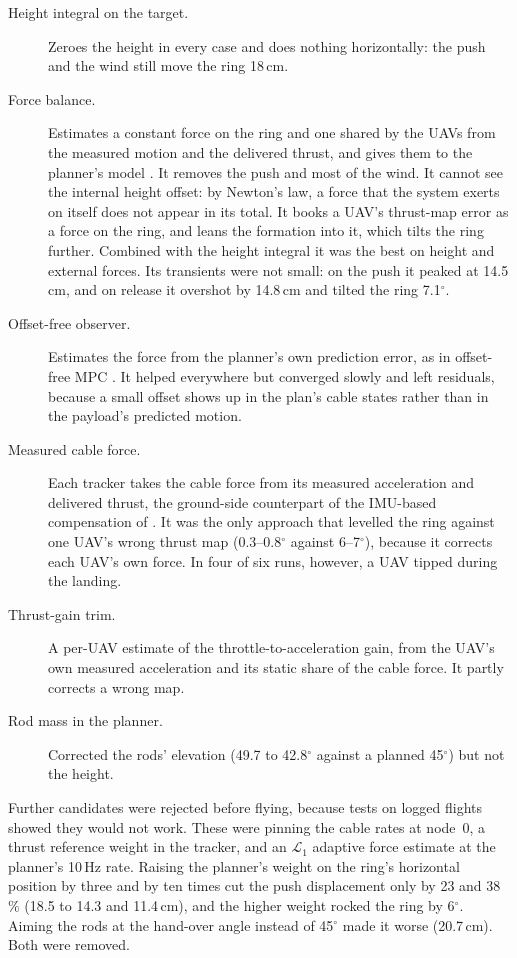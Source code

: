 \begin{description}
    \item[Height integral on the target.] Zeroes the height in every case and does nothing
    horizontally: the push and the wind still move the ring 18\,cm.
    \item[Force balance.] Estimates a constant force on the ring and one shared by the UAVs from
    the measured motion and the delivered thrust, and gives them to the planner's model
    \cite{muske2002disturbance}. It removes the push and most of the wind. It cannot see the internal
    height offset: by Newton's law, a force that the system exerts on itself does not appear in its
    total. It books a UAV's thrust-map error as a force on the ring, and leans the formation into
    it, which tilts the ring further. Combined with the height integral it was the best on height and
    external forces. Its transients were not small: on the push it peaked at 14.5\,cm, and on release
    it overshot by 14.8\,cm and tilted the ring 7.1$^\circ$.
    \item[Offset-free observer.] Estimates the force from the planner's own prediction error, as in
    offset-free MPC \cite{pannocchia2003disturbance}. It helped everywhere but converged slowly and left
    residuals, because a small offset shows up in the plan's cable states rather than in the payload's
    predicted motion.
    \item[Measured cable force.] Each tracker takes the cable force from its measured acceleration
    and delivered thrust, the ground-side counterpart of the IMU-based compensation of
    \cite{tudelft}. It was the only approach that levelled the ring against one UAV's wrong thrust
    map (0.3--0.8$^\circ$ against 6--7$^\circ$), because it corrects each UAV's own force. In four of
    six runs, however, a UAV tipped during the landing.
    \item[Thrust-gain trim.] A per-UAV estimate of the throttle-to-acceleration gain, from the UAV's
    own measured acceleration and its static share of the cable force. It partly corrects a wrong map.
    \item[Rod mass in the planner.] Corrected the rods' elevation (49.7 to 42.8$^\circ$ against a planned
    45$^\circ$) but not the height.
\end{description}
Further candidates were rejected before flying, because tests on logged flights showed they would
not work. These were pinning the cable rates at node~0, a thrust reference weight in the
tracker, and an $\mathcal{L}_1$ adaptive force estimate \cite{hovakimyan2010l1} at the planner's
10\,Hz rate. Raising the planner's weight on the ring's horizontal position by three and by ten times
cut the push displacement only by 23 and 38\,\% (18.5 to 14.3 and 11.4\,cm), and the higher weight
rocked the ring by 6$^\circ$. Aiming the rods at the hand-over angle instead of 45$^\circ$ made it
worse (20.7\,cm). Both were removed.

